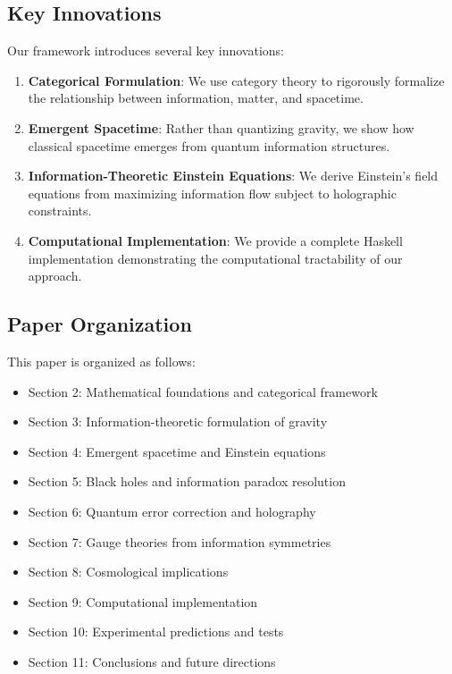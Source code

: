 \documentclass[12pt]{article}
\begin{document}
\subsection{Key Innovations}

Our framework introduces several key innovations:

\begin{enumerate}
\item \textbf{Categorical Formulation}: We use category theory to rigorously formalize the relationship between information, matter, and spacetime.

\item \textbf{Emergent Spacetime}: Rather than quantizing gravity, we show how classical spacetime emerges from quantum information structures.

\item \textbf{Information-Theoretic Einstein Equations}: We derive Einstein's field equations from maximizing information flow subject to holographic constraints.

\item \textbf{Computational Implementation}: We provide a complete Haskell implementation demonstrating the computational tractability of our approach.
\end{enumerate}

\subsection{Paper Organization}

This paper is organized as follows:
\begin{itemize}
\item Section 2: Mathematical foundations and categorical framework
\item Section 3: Information-theoretic formulation of gravity
\item Section 4: Emergent spacetime and Einstein equations
\item Section 5: Black holes and information paradox resolution
\item Section 6: Quantum error correction and holography
\item Section 7: Gauge theories from information symmetries
\item Section 8: Cosmological implications
\item Section 9: Computational implementation
\item Section 10: Experimental predictions and tests
\item Section 11: Conclusions and future directions
\end{itemize}
\end{document}
